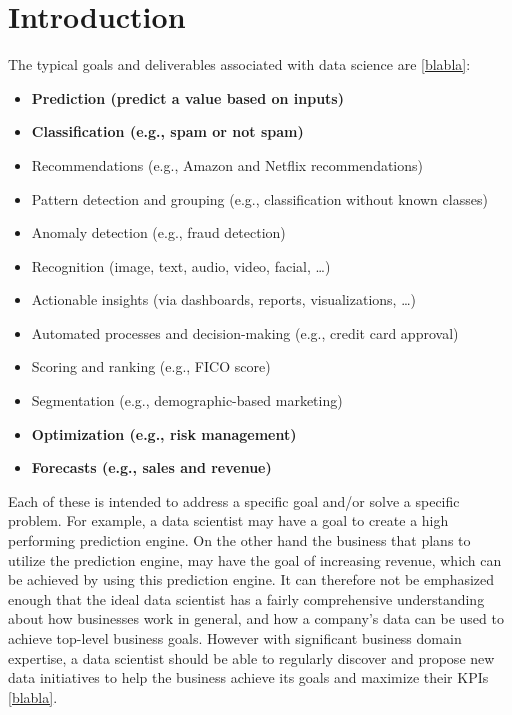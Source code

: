 \documentclass[11pt,fleqn]{book} %
\begin{document}
\chapterimage{} %


\chapter{Introduction}

The typical goals and deliverables associated with data science are \ref{blabla}:

\begin{itemize}
\item \textbf{Prediction (predict a value based on inputs)}
\item \textbf{Classification (e.g., spam or not spam)}
\item Recommendations (e.g., Amazon and Netflix recommendations)
\item Pattern detection and grouping (e.g., classification without known classes)
\item Anomaly detection (e.g., fraud detection)
\item Recognition (image, text, audio, video, facial, …)
\item Actionable insights (via dashboards, reports, visualizations, …)
\item Automated processes and decision-making (e.g., credit card approval)
\item Scoring and ranking (e.g., FICO score)
\item Segmentation (e.g., demographic-based marketing)
\item \textbf{Optimization (e.g., risk management)}
\item \textbf{Forecasts (e.g., sales and revenue)}
\end{itemize}

Each of these is intended to address a specific goal and/or solve a specific problem. For example, a data scientist may have a goal to create a high performing prediction engine. On the other hand the business that plans to utilize the prediction engine, may have the goal of increasing revenue, which can be achieved by using this prediction engine. It can therefore not be emphasized enough that the ideal data scientist has a fairly comprehensive understanding about how businesses work in general, and how a company’s data can be used to achieve top-level business goals. However with significant business domain expertise, a data scientist should be able to regularly discover and propose new data initiatives to help the business achieve its goals and maximize their KPIs \ref{blabla}.
\end{document}
